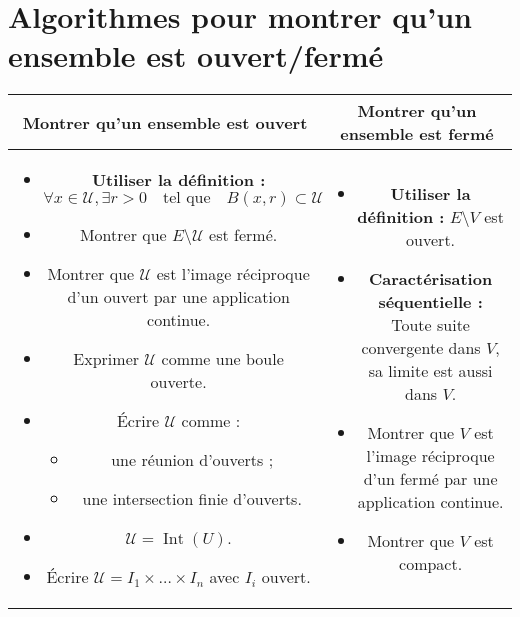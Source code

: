\section{Algorithmes pour montrer qu'un ensemble est ouvert/fermé}
\begin{center}
    
\begin{tabular}{c | c}
    {\large \bf
    Montrer qu'un ensemble est ouvert      } 
 & 
    {\large \bf
    Montrer qu'un ensemble est fermé }
 \\
 \hline
 \parbox[t]{8cm}{
\begin{itemize}
    \item \textbf{Utiliser la définition :} 
    \[
    \forall x \in \mathcal{U}, \exists r > 0 \quad \text{tel que} \quad B(x, r) \subset \mathcal{U}
    \]
    
    \item Montrer que \( E \setminus \mathcal{U} \) est fermé.
    
    \item Montrer que \(\mathcal{U}\) est l'image réciproque d'un ouvert par une application continue.
    
    \item Exprimer \(\mathcal{U}\) comme une boule ouverte.
    
    \item Écrire \(\mathcal{U}\) comme :
    \begin{itemize}
        \item une réunion d'ouverts ;
        \item une intersection finie d'ouverts.
    \end{itemize}
    
    \item \(\mathcal{U} = \operatorname{Int}(U)\).
    
    \item Écrire \(\mathcal{U} = I_1 \times \dots \times I_n\) avec \( I_i \) ouvert.
\end{itemize}
} & \parbox[t]{8cm}{
\begin{itemize}
    \item \textbf{Utiliser la définition :} \( E \setminus V \) est ouvert.
    
    \item \textbf{Caractérisation séquentielle :} Toute suite convergente dans \(V\), sa limite est aussi dans \(V\).
    
    \item Montrer que \(V\) est l'image réciproque d'un fermé par une application continue.
    
    \item Montrer que \(V\) est compact.
\end{itemize}
}
\end{tabular}
\end{center}
